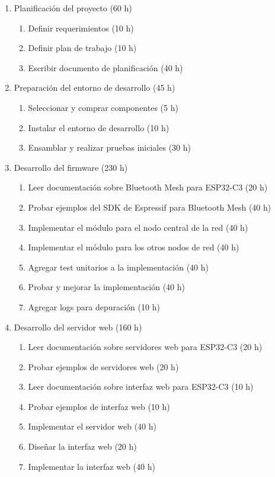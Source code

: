 \documentclass[
11pt, %
]{charter}
\begin{document}
\begin{enumerate}
\item  Planificación del proyecto (60 h)
	\begin{enumerate}
	\item Definir requerimientos (10 h)
	\item Definir plan de trabajo (10 h)
	\item Escribir documento de planificación (40 h)
	\end{enumerate}

\item Preparación del entorno de desarrollo (45 h)
	\begin{enumerate}
	\item Seleccionar y comprar componentes (5 h)
	\item Instalar el entorno de desarrollo (10 h)
	\item Ensamblar y realizar pruebas iniciales (30 h)
	\end{enumerate}

\item Desarrollo del firmware (230 h)
	\begin{enumerate}
	\item Leer documentación sobre Bluetooth Mesh para ESP32-C3 (20 h)
	\item Probar ejemplos del SDK de Espressif para Bluetooth Mesh (40 h)
	\item Implementar el módulo para el nodo central de la red (40 h)	
	\item Implementar el módulo para los otros nodos de red (40 h)
	\item Agregar test unitarios a la implementación (40 h)
	\item Probar y mejorar la implementación (40 h)
	\item Agregar logs para depuración (10 h)
	\end{enumerate}

\item Desarrollo del servidor web (160 h)
	\begin{enumerate}
	\item Leer documentación sobre servidores web para ESP32-C3 (20 h)
	\item Probar ejemplos de servidores web (20 h)
	\item Leer documentación sobre interfaz web para ESP32-C3 (10 h)
	\item Probar ejemplos de interfaz web (10 h)
	\item Implementar el servidor web (40 h)
	\item Diseñar la interfaz web (20 h)
	\item Implementar la interfaz web (40 h)
	\end{enumerate}


\end{enumerate}
\end{document}

